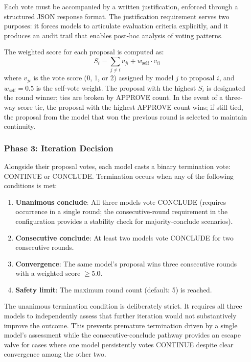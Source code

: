 \documentclass[11pt,a4paper]{article}
\begin{document}
Each vote must be accompanied by a written justification, enforced through a structured JSON response format. The justification requirement serves two purposes: it forces models to articulate evaluation criteria explicitly, and it produces an audit trail that enables post-hoc analysis of voting patterns.

The weighted score for each proposal is computed as:
\begin{equation}
    S_i = \sum_{j \neq i} v_{ji} + w_{\text{self}} \cdot v_{ii}
    \label{eq:score}
\end{equation}
where $v_{ji}$ is the vote score (0, 1, or 2) assigned by model $j$ to proposal $i$, and $w_{\text{self}} = 0.5$ is the self-vote weight. The proposal with the highest $S_i$ is designated the round winner; ties are broken by APPROVE count. In the event of a three-way score tie, the proposal with the highest APPROVE count wins; if still tied, the proposal from the model that won the previous round is selected to maintain continuity.

\subsubsection{Phase 3: Iteration Decision}

Alongside their proposal votes, each model casts a binary termination vote: CONTINUE or CONCLUDE. Termination occurs when any of the following conditions is met:

\begin{enumerate}[nosep]
    \item \textbf{Unanimous conclude}: All three models vote CONCLUDE (requires occurrence in a single round; the consecutive-round requirement in the configuration provides a stability check for majority-conclude scenarios).
    \item \textbf{Consecutive conclude}: At least two models vote CONCLUDE for two consecutive rounds.
    \item \textbf{Convergence}: The same model's proposal wins three consecutive rounds with a weighted score $\geq 5.0$.
    \item \textbf{Safety limit}: The maximum round count (default: 5) is reached.
\end{enumerate}

The unanimous termination condition is deliberately strict. It requires all three models to independently assess that further iteration would not substantively improve the outcome. This prevents premature termination driven by a single model's assessment while the consecutive-conclude pathway provides an escape valve for cases where one model persistently votes CONTINUE despite clear convergence among the other two.
\end{document}

